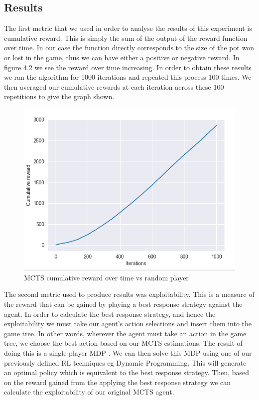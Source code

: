 \subsection{Results}\label{subsec:results1}
The first metric that we used in order to analyse the results of this experiment is cumulative reward.
This is simply the sum of the output of the reward function over time.
In our case the function directly corresponds to the size of the pot won or lost in the game,
thus we can have either a positive or negative reward.
In figure 4.2 we see the reward over time increasing.
In order to obtain these results we ran the algorithm for 1000 iterations and repeated this process 100 times.
We then averaged our cumulative rewards at each iteration across these 100 repetitions to give the graph shown.

\begin{figure}[ht]
    \includegraphics[scale=.5]{images/cumulative_reward_mcts_vs_random.png}
    \caption{MCTS cumulative reward over time vs random player}
\end{figure}

The second metric used to produce results was exploitability.
This is a measure of the reward that can be gained by playing a best response strategy
against the agent.
In order to calculate the best response strategy, and hence the exploitability we must
take our agent's action selections and insert them into the game tree\citep{heinrich2017reinforcement}.
In other words, wherever the agent must take an action in the game tree, we choose the best action
based on our MCTS estimations.
The result of doing this is a single-player MDP .
We can then solve this MDP using one of our previously defined RL techniques eg Dynamic Programming.
This will generate an optimal policy which is equivalent to the best response strategy.
Then, based on the reward gained from the applying the best response strategy we can
calculate the exploitability of our original MCTS agent.

